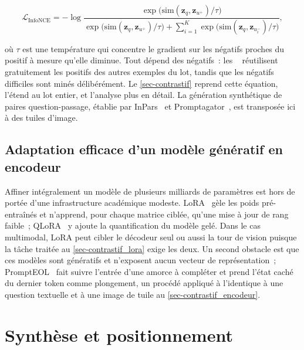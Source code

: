 \begin{equation}
\mathcal{L}_{\text{InfoNCE}}
= -\log
\frac{\exp\!\big(\mathrm{sim}(\mathbf{z}_q, \mathbf{z}_{u^{+}}) / \tau\big)}
     {\exp\!\big(\mathrm{sim}(\mathbf{z}_q, \mathbf{z}_{u^{+}}) / \tau\big)
      + \sum_{i=1}^{K}
      \exp\!\big(\mathrm{sim}(\mathbf{z}_q, \mathbf{z}_{u^{-}_i}) / \tau\big)},
\label{eq-infonce}
\end{equation}

où $\tau$ est une température qui concentre le gradient sur les négatifs
proches du positif à mesure qu'elle diminue. Tout dépend des négatifs~: les
~\citep{dpr2020} réutilisent gratuitement les
positifs des autres exemples du lot, tandis que les négatifs difficiles sont
minés délibérément. Le \cref{sec-contrastif} reprend cette équation, l'étend
au lot entier, et l'analyse plus en détail. La génération synthétique de
paires question-passage, établie par InPars~\citep{inpars2022} et
Promptagator~\citep{promptagator2022}, est transposée ici à des tuiles
d'image.

\subsection{Adaptation efficace d'un modèle génératif en encodeur}
\label{sec-eda_contrastif_adaptation}

Affiner intégralement un modèle de plusieurs milliards de paramètres est hors
de portée d'une infrastructure académique modeste. LoRA~\citep{lora2021} gèle
les poids pré-entraînés et n'apprend, pour chaque matrice ciblée, qu'une mise à
jour de rang faible~; QLoRA~\citep{qlora2023} y ajoute la quantification du
modèle gelé. Dans le cas multimodal, LoRA peut cibler le décodeur seul ou
aussi la tour de vision puisque la tâche traitée au \cref{sec-contrastif_lora}
exige les deux. Un second obstacle est que ces modèles sont génératifs et
n'exposent aucun vecteur de représentation~; PromptEOL~\citep{prompteol2024}
fait suivre l'entrée d'une amorce à compléter et prend l'état caché du
dernier token comme plongement, un procédé appliqué à l'identique à une
question textuelle et à une image de tuile au \cref{sec-contrastif_encodeur}.

\section{Synthèse et positionnement}
\label{sec-eda_synthese}

